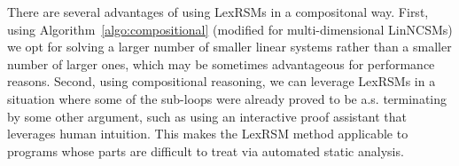 There are several advantages of using LexRSMs in a compositonal way. First, using Algorithm~\ref{algo:compositional} (modified for multi-dimensional LinNCSMs) we opt for solving a larger number of smaller linear systems rather than a smaller number of larger ones, which may be sometimes advantageous for performance reasons. Second, using compositional reasoning, we can leverage LexRSMs in a situation where some of the sub-loops were already proved to be a.s. terminating by some other argument, such as using an interactive proof assistant that leverages human intuition. This makes the LexRSM method applicable to programs whose parts are difficult to treat via automated static analysis.




